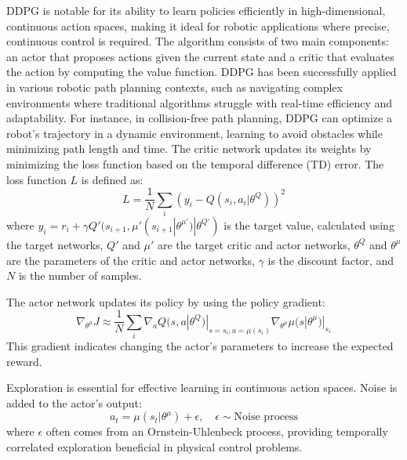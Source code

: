 \documentclass[a4paper,fleqn]{cas-dc}
\begin{document}
DDPG is notable for its ability to learn policies efficiently in high-dimensional, continuous action spaces, making it ideal for robotic applications where precise, continuous control is required. The algorithm consists of two main components: an actor that proposes actions given the current state and a critic that evaluates the action by computing the value function.
DDPG has been successfully applied in various robotic path planning contexts, such as navigating complex environments where traditional algorithms struggle with real-time efficiency and adaptability. For instance, in collision-free path planning, DDPG can optimize a robot's trajectory in a dynamic environment, learning to avoid obstacles while minimizing path length and time.
The critic network updates its weights by minimizing the loss function based on the temporal difference (TD) error. The loss function \( L \) is defined as:
\begin{equation}
L = \frac{1}{N} \sum_i \left(y_i - Q(s_i, a_i | \theta^Q)\right)^2
\end{equation}
where \( y_i = r_i + \gamma Q'(s_{i+1}, \mu'(s_{i+1} | \theta^{\mu'}) | \theta^{Q'}) \) is the target value, calculated using the target networks, \( Q' \) and \( \mu' \) are the target critic and actor networks, \( \theta^Q \) and \( \theta^{\mu} \) are the parameters of the critic and actor networks, \( \gamma \) is the discount factor, and \( N \) is the number of samples.

The actor network updates its policy by using the policy gradient:
\begin{equation}
\nabla_{\theta^\mu} J \approx \frac{1}{N} \sum_i \nabla_a Q(s, a | \theta^Q)|_{s=s_i, a=\mu(s_i)} \nabla_{\theta^\mu} \mu(s | \theta^\mu)|_{s_i}
\end{equation}
This gradient indicates changing the actor's parameters to increase the expected reward.

Exploration is essential for effective learning in continuous action spaces. Noise is added to the actor's output:
\begin{equation}
a_t = \mu(s_t|\theta^\mu) + \epsilon, \quad \epsilon \sim \text{Noise process}
\end{equation}
where \( \epsilon \) often comes from an Ornstein-Uhlenbeck process, providing temporally correlated exploration beneficial in physical control problems.
\end{document}
